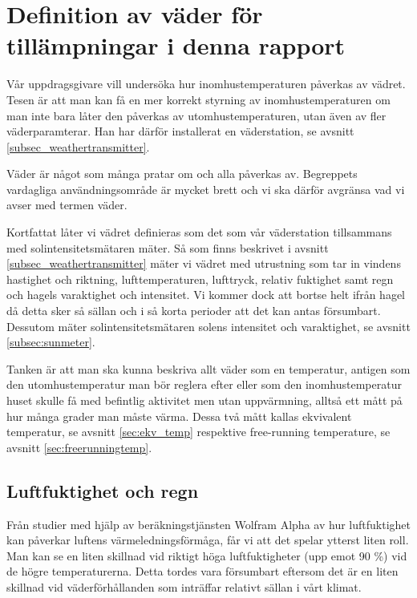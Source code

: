 \section{Definition av väder för tillämpningar i denna rapport}
\label{subsec_weather}
Vår uppdragsgivare vill undersöka hur inomhustemperaturen påverkas av vädret. Tesen är att man kan få en mer korrekt styrning av inomhustemperaturen om man inte bara låter den påverkas av utomhustemperaturen, utan även av fler väderparamterar. Han har därför installerat en väderstation, se avsnitt \ref{subsec_weathertransmitter}.

Väder är något som många pratar om och alla påverkas av. Begreppets vardagliga användningsområde är mycket brett och vi ska därför avgränsa vad vi avser med termen väder. 

Kortfattat låter vi vädret definieras som det som vår väderstation tillsammans med solintensitetsmätaren mäter. Så som finns beskrivet i avsnitt \ref{subsec_weathertransmitter} mäter vi vädret med utrustning som tar in vindens hastighet och riktning, lufttemperaturen, lufttryck, relativ fuktighet samt regn och hagels varaktighet och intensitet. Vi kommer dock att bortse helt ifrån hagel då detta sker så sällan och i så korta perioder att det kan antas försumbart.  Dessutom mäter solintensitetsmätaren solens intensitet och varaktighet, se avsnitt \ref{subsec:sunmeter}. %

Tanken är att man ska kunna beskriva allt väder som en temperatur, antigen som den utomhustemperatur man bör reglera efter eller som den inomhustemperatur huset skulle få med befintlig aktivitet men utan uppvärmning, alltså ett mått på hur många grader man måste värma. Dessa två mått kallas ekvivalent temperatur, se avsnitt \ref{sec:ekv_temp} respektive free-running temperature, se avsnitt \ref{sec:freerunningtemp}. 

\subsection{Luftfuktighet och regn}
Från studier med hjälp av beräkningstjänsten Wolfram Alpha\cite{wolframalpha} av hur luftfuktighet kan påverkar luftens värmeledningsförmåga, får vi att det spelar ytterst liten roll. Man kan se en liten skillnad vid riktigt höga luftfuktigheter (upp emot 90 \%) vid de högre temperaturerna. Detta tordes vara försumbart eftersom det är en liten skillnad vid väderförhållanden som inträffar relativt sällan i vårt klimat.

